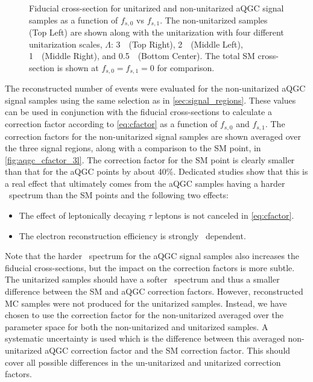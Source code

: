 \begin{figure}[ht!]
\caption{Fiducial cross-section for unitarized and non-unitarized aQGC signal samples as a function of $f_{s,0}$ vs $f_{s,1}$.
The non-unitarized samples (Top Left) are shown along with the unitarization with 
four different unitarization scales, $\Lambda$: 3~\TeV~(Top Right),
2~\TeV~(Middle Left), 1~\TeV~(Middle Right), and 0.5~\TeV~(Bottom Center).
The total SM cross-section is shown at $f_{s,0}=f_{s,1}=0$ for comparison.}
\label{fig:aqgc_fiducial_xsec_3l}
\end{figure}



The reconstructed number of events were evaluated for the non-unitarized
aQGC signal samples using the same selection as in \sec\ref{sec:signal_regions}.
These values can be used in conjunction with the fiducial cross-sections
to calculate a correction factor according to \eqn\eqref{eq:cfactor} as a function 
of $f_{s,0}$ and $f_{s,1}$. The correction factors for the non-unitarized signal samples
are shown averaged over the three signal regions, along with a comparison to the SM point,
in \fig\ref{fig:aqgc_cfactor_3l}.
The correction factor for the SM point is clearly smaller than that for the aQGC
points by about 40\%. Dedicated studies show that this is a real effect 
that ultimately comes from the aQGC samples having a harder \pt~spectrum
than the SM points and the following two effects:
\begin{itemize}
\item The effect of leptonically decaying $\tau$ leptons is not 
canceled in \eqn\eqref{eq:cfactor}.
\item The electron reconstruction efficiency is strongly \pt~dependent.
\end{itemize}
Note that the harder \pt~spectrum for the aQGC signal samples also 
increases the fiducial cross-sections, but the impact on the correction factors is more subtle.
The unitarized samples should have a softer \pt~spectrum and thus a
smaller difference between the SM and aQGC correction factors. However,
reconstructed MC samples were not produced for the unitarized samples.
Instead, we have chosen to use the 
correction factor for the non-unitarized averaged over the parameter space for 
both the non-unitarized and unitarized samples.  A systematic uncertainty  
is used which is the difference between this averaged non-unitarized
aQGC correction factor and the SM correction factor. This should cover all possible differences
in the un-unitarized and unitarized correction factors.

